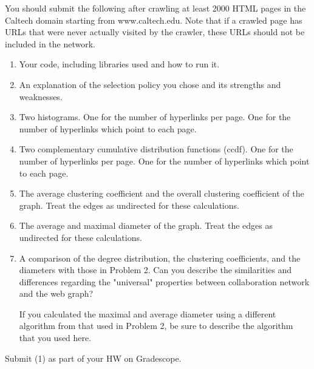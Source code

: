 \documentclass[11pt]{article}
\begin{document}
 You should submit the following after
crawling at least 2000 HTML pages in the Caltech domain starting from
www.caltech.edu. Note that if a crawled page has URLs that were never actually visited by the crawler, these URLs should not be included in the network.
\begin{enumerate}
\item Your code, including libraries used and how to run it.
\item An explanation of the selection policy you chose and its
  strengths and weaknesses.
\item Two histograms. One for the number of hyperlinks per page.  One for
  the number of hyperlinks which point to each page.
\item Two complementary cumulative distribution functions (ccdf).  One
  for the number of hyperlinks per page. One for the number of
  hyperlinks which point to each page.
\item The average clustering coefficient and the overall clustering coefficient of the graph. Treat the edges as undirected for these calculations.
\item The average and maximal diameter of the graph. Treat the edges as undirected for these calculations.
\item A comparison of the degree distribution, the clustering
coefficients, and the diameters with those in Problem 2. Can you describe the similarities and differences regarding the "universal" properties between collaboration network and the web graph?

If you calculated the maximal and average diameter using a different algorithm from that used in Problem 2, be sure to describe the algorithm that you used here.
\end{enumerate}
Submit (1) as part of your HW on Gradescope.\\
\end{document}
